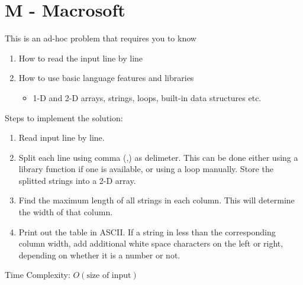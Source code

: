 \documentclass{article}
\begin{document}
\section*{M - Macrosoft}
This is an ad-hoc problem that requires you to know
\begin{enumerate}
\item How to read the input line by line
\item How to use basic language features and libraries
\begin{itemize}
\item 1-D and 2-D arrays, strings, loops, built-in data structures etc.
\end{itemize}
\end{enumerate}
Steps to implement the solution:
\begin{enumerate}
\item Read input line by line.
\item Split each line using comma (,) as delimeter. This can be done either using a library function if one is available, or using a loop manually. Store the splitted strings into a 2-D array. 
\item Find the maximum length of all strings in each column. This will determine the width of that column.
\item Print out the table in ASCII. If a string in less than the corresponding column width, add additional white space characters on the left or right, depending on whether it is a number or not.
\end{enumerate}
Time Complexity: $O(\text{size of input})$
\end{document}
